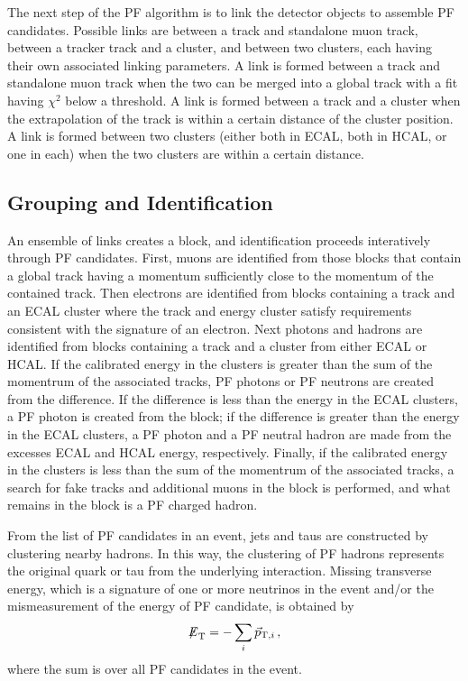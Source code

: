 The next step of the PF algorithm is to link the detector objects to assemble PF candidates.
Possible links are between a track and standalone muon track, between a tracker track and a cluster, and
between two clusters, each having their own associated linking parameters. A link is formed between
a track and standalone muon track when the two can be merged into a global track with a fit
having $\chi^2$ below a threshold. A link is formed between a track and a cluster when the extrapolation of the track is within a certain distance of the cluster position. A link is formed between two clusters
(either both in ECAL, both in HCAL, or one in each) when the two clusters are within a certain distance.

\subsection{Grouping and Identification\label{subsec:groupid}}

An ensemble of links creates a block, and identification proceeds interatively through PF candidates.
First, muons are identified from those blocks that contain a global track having a momentum
sufficiently close to the momentum of the contained track. Then electrons are identified from blocks
containing a track and an ECAL cluster where the track and energy cluster satisfy requirements
consistent with the signature of an electron. Next photons and hadrons are identified from blocks
containing a track and a cluster from either ECAL or HCAL. If the calibrated energy in the clusters is
greater than the sum of the momentrum of the associated tracks, PF photons or PF neutrons are created
from the difference. If the difference is less than the energy in the ECAL clusters, a PF photon is
created from the block; if the difference is greater than the energy in the ECAL clusters,
a PF photon and a PF neutral hadron are made from the excesses ECAL and HCAL energy, respectively.
Finally, if the calibrated energy in the clusters is less than the sum of the momentrum of the associated
tracks, a search for fake tracks and additional muons in the block is performed, and what remains
in the block is a PF charged hadron.

From the list of PF candidates in an event, jets and taus are constructed by clustering nearby
hadrons. In this way, the clustering of PF hadrons represents the original quark or tau from the
underlying interaction. Missing transverse energy, which is a signature of one or more neutrinos
in the event and/or the mismeasurement of the energy of PF candidate, is obtained by
\begin{equation}
{\not\mathrel{E}}_{\text{T}} = - \sum_i \vec{p}_{{\rm T},i} \, ,
\end{equation}
where the sum is over all PF candidates in the event.

